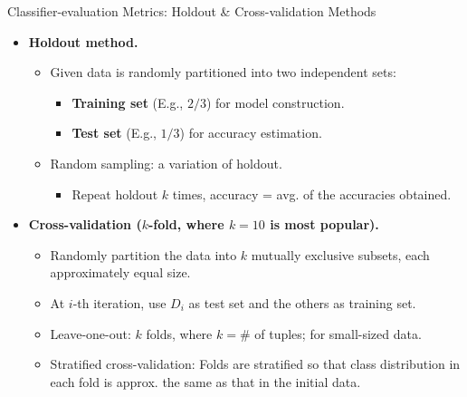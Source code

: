 \begin{frame}{Classifier-evaluation Metrics: Holdout \& Cross-validation Methods}
  \begin{itemize}
  \item \textbf{Holdout method.}
    \begin{itemize}
    \item Given data is randomly partitioned into two independent sets:
      \begin{itemize}
      \item \textbf{\color{airforceblue}Training set} (E.g., $2/3$) for model construction.
      \item \textbf{\color{airforceblue}Test set} (E.g., $1/3$) for accuracy estimation.
      \end{itemize}
    \item Random sampling: a variation of holdout.
      \begin{itemize}
      \item Repeat holdout $k$ times, accuracy = avg. of the accuracies obtained.
      \end{itemize}
    \end{itemize}
  \item \textbf{{\color{airforceblue}Cross-validation} ($k$-fold, where $k = 10$ is most popular).}
    \begin{itemize}
    \item Randomly partition the data into $k$ mutually exclusive subsets, each approximately equal size.
    \item At $i$-th iteration, use $D_i$ as test set and the others as training set.
    \item Leave-one-out: $k$ folds, where $k = \#$ of tuples; for small-sized data.
    \item Stratified cross-validation: Folds are stratified so that class distribution in each fold is approx. the same as that in the initial data.
    \end{itemize}
  \end{itemize}
\end{frame}

